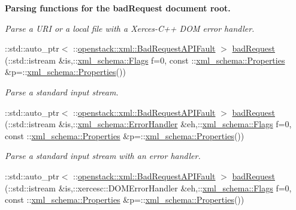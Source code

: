 \begin{Indent}{\bf Parsing functions for the badRequest document root.}
\begin{DoxyCompactItemize}
\begin{DoxyCompactList}\small\item\em Parse a URI or a local file with a Xerces-\/C++ DOM error handler. \item\end{DoxyCompactList}\item 
::std::auto\_\-ptr$<$ ::\hyperlink{classopenstack_1_1xml_1_1BadRequestAPIFault}{openstack::xml::BadRequestAPIFault} $>$ \hyperlink{namespaceopenstack_1_1xml_a1833c66d4ecc1a505b950e82eb99d44e}{badRequest} (::std::istream \&is,::\hyperlink{namespacexml__schema_affb4c227cbd9aa7453dd1dc5a1401943}{xml\_\-schema::Flags} f=0, const ::\hyperlink{namespacexml__schema_ad27ce19a7ee1d3b1064092648898f64c}{xml\_\-schema::Properties} \&p=::\hyperlink{namespacexml__schema_ad27ce19a7ee1d3b1064092648898f64c}{xml\_\-schema::Properties}())
\begin{DoxyCompactList}\small\item\em Parse a standard input stream. \item\end{DoxyCompactList}\item 
::std::auto\_\-ptr$<$ ::\hyperlink{classopenstack_1_1xml_1_1BadRequestAPIFault}{openstack::xml::BadRequestAPIFault} $>$ \hyperlink{namespaceopenstack_1_1xml_aa009a549be5d663603dc404cefbe8e5e}{badRequest} (::std::istream \&is,::\hyperlink{namespacexml__schema_ab1c9361bfd3b404eaabf0c31eded79dc}{xml\_\-schema::ErrorHandler} \&eh,::\hyperlink{namespacexml__schema_affb4c227cbd9aa7453dd1dc5a1401943}{xml\_\-schema::Flags} f=0, const ::\hyperlink{namespacexml__schema_ad27ce19a7ee1d3b1064092648898f64c}{xml\_\-schema::Properties} \&p=::\hyperlink{namespacexml__schema_ad27ce19a7ee1d3b1064092648898f64c}{xml\_\-schema::Properties}())
\begin{DoxyCompactList}\small\item\em Parse a standard input stream with an error handler. \item\end{DoxyCompactList}\item 
::std::auto\_\-ptr$<$ ::\hyperlink{classopenstack_1_1xml_1_1BadRequestAPIFault}{openstack::xml::BadRequestAPIFault} $>$ \hyperlink{namespaceopenstack_1_1xml_a25adc10834238bc5c055c4f2c42b162e}{badRequest} (::std::istream \&is,::xercesc::DOMErrorHandler \&eh,::\hyperlink{namespacexml__schema_affb4c227cbd9aa7453dd1dc5a1401943}{xml\_\-schema::Flags} f=0, const ::\hyperlink{namespacexml__schema_ad27ce19a7ee1d3b1064092648898f64c}{xml\_\-schema::Properties} \&p=::\hyperlink{namespacexml__schema_ad27ce19a7ee1d3b1064092648898f64c}{xml\_\-schema::Properties}())

\end{DoxyCompactItemize}
\end{Indent}
